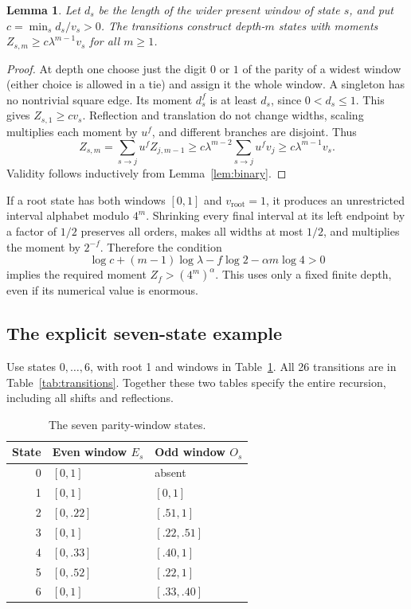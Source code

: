 \documentclass[11pt]{article}
\newtheorem{lemma}[theorem]{Lemma}
\theoremstyle{definition}
\theoremstyle{remark}
\begin{document}
\begin{lemma}\label{lem:growth}
Let $d_s$ be the length of the wider present window of state $s$, and put
$c=\min_s d_s/v_s>0$. The transitions construct depth-$m$ states with
moments $Z_{s,m}\ge c\lambda^{m-1}v_s$ for all $m\ge1$.
\end{lemma}
\begin{proof}
At depth one choose just the digit $0$ or $1$ of the parity of a widest
window (either choice is allowed in a tie) and assign it the whole window. A singleton has no nontrivial
square edge. Its moment $d_s^f$ is at least $d_s$, since $0<d_s\le1$.
This gives $Z_{s,1}\ge cv_s$. Reflection and translation do not change
widths, scaling multiplies each moment by $u^f$, and different branches
are disjoint. Thus
\[
 Z_{s,m}=\sum_{s\to j}u^fZ_{j,m-1}
 \ge c\lambda^{m-2}\sum_{s\to j}u^fv_j\ge c\lambda^{m-1}v_s.
\]
Validity follows inductively from Lemma~\ref{lem:binary}.
\end{proof}

If a root state has both windows $[0,1]$ and $v_{\mathrm{root}}=1$, it
produces an unrestricted interval alphabet modulo $4^m$.
Shrinking every final interval at its left endpoint by a factor of $1/2$
preserves all orders, makes all widths at most $1/2$, and multiplies the
moment by $2^{-f}$. Therefore the condition
\begin{equation}\label{eq:binarymargin}
 \log c+(m-1)\log \lambda-f\log2-\alpha m\log4>0
\end{equation}
implies the required moment $Z_f>(4^m)^\alpha$. This uses only a fixed
finite depth, even if its numerical value is enormous.

\subsection{The explicit seven-state example}
Use states $0,\ldots,6$, with root 1 and windows in
Table~\ref{tab:windows}. All 26 transitions are in
Table~\ref{tab:transitions}. Together these two tables specify the entire
recursion, including all shifts and reflections.
\begin{table}[ht]
\centering
\begin{tabular}{rll}\toprule
State&Even window $E_s$&Odd window $O_s$\\\midrule
0&$[0,1]$&absent\\
1&$[0,1]$&$[0,1]$\\
2&$[0,.22]$&$[.51,1]$\\
3&$[0,1]$&$[.22,.51]$\\
4&$[0,.33]$&$[.40,1]$\\
5&$[0,.52]$&$[.22,1]$\\
6&$[0,1]$&$[.33,.40]$\\\bottomrule
\end{tabular}
\caption{The seven parity-window states.}\label{tab:windows}
\end{table}
\end{document}

